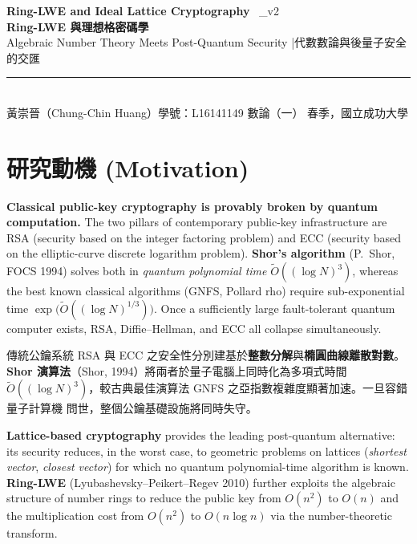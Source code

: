 \documentclass[12pt, a4paper]{article}
\begin{document}
\begin{center}
  {\LARGE\bfseries\color{accent}
    Ring-LWE and Ideal Lattice Cryptography}
  \ {\normalsize\color{gray}\textnormal{\_v2}}\\[4pt]
  {\large\bfseries Ring-LWE 與理想格密碼學}\\[2pt]
  {\normalsize Algebraic Number Theory Meets Post-Quantum Security
    \quad|\quad 代數數論與後量子安全的交匯}\\[8pt]
  \rule{\linewidth}{0.8pt}\\[4pt]
  {\small 黃崇晉（Chung-Chin Huang）\quad 學號：L16141149
    \quad 數論（一） 春季，國立成功大學}
\end{center}

\vspace{4pt}

\section{研究動機 \small\normalfont\color{gray}(Motivation)}

\textbf{Classical public-key cryptography is provably broken by quantum computation.}
The two pillars of contemporary public-key infrastructure are RSA (security based on the
integer factoring problem) and ECC (security based on the elliptic-curve discrete logarithm
problem). \textbf{Shor's algorithm} (P.\ Shor, FOCS 1994) solves both in
\textit{quantum polynomial time} $\widetilde{O}((\log N)^3)$, whereas the best known classical
algorithms (GNFS, Pollard rho) require sub-exponential time
$\exp\!\bigl(\widetilde{O}((\log N)^{1/3})\bigr)$. Once a sufficiently large fault-tolerant
quantum computer exists, RSA, Diffie--Hellman, and ECC all collapse simultaneously.

傳統公鑰系統 RSA 與 ECC 之安全性分別建基於\textbf{整數分解}與\textbf{橢圓曲線離散對數}。
\textbf{Shor 演算法}（Shor, 1994）將兩者於量子電腦上同時化為多項式時間
$\widetilde{O}((\log N)^3)$，較古典最佳演算法 GNFS 之亞指數複雜度顯著加速。一旦容錯量子計算機
問世，整個公鑰基礎設施將同時失守。

\textbf{Lattice-based cryptography} provides the leading post-quantum alternative: its security
reduces, in the worst case, to geometric problems on lattices (\textit{shortest vector},
\textit{closest vector}) for which no quantum polynomial-time algorithm is known.
\textbf{Ring-LWE} (Lyubashevsky--Peikert--Regev 2010) further exploits the algebraic
structure of number rings to reduce the public key from $O(n^2)$ to $O(n)$ and the
multiplication cost from $O(n^2)$ to $O(n\log n)$ via the number-theoretic transform.
\end{document}
